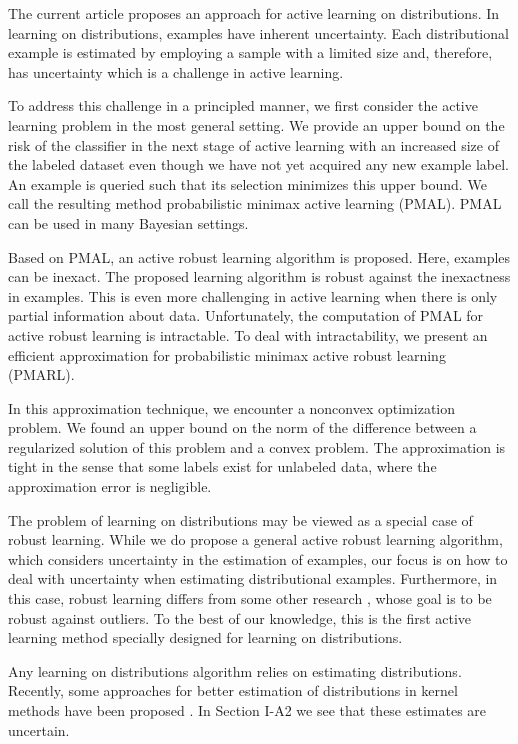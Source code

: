\documentclass[10pt,twocolumn]{IEEEtran}
\begin{document}
	The current article proposes an approach for active learning on distributions. In learning on distributions, examples have inherent uncertainty. Each distributional example is estimated by employing a sample with a limited size and, therefore, has uncertainty which is a challenge in active learning.
	
	To address this challenge in a principled manner, we first consider the active learning problem in the most general setting. We provide an upper bound on the risk of the classifier in the next stage of active learning with an increased size of the labeled dataset even though we have not yet acquired any new example label. An example is queried such that its selection minimizes this upper bound. We call the resulting method probabilistic minimax active learning (PMAL). PMAL can be used in many Bayesian settings.
	
	Based on PMAL, an active robust learning algorithm is proposed. Here, examples can be inexact. The proposed learning algorithm is robust against the inexactness in examples. This is even more challenging in active learning when there is only partial information about data. Unfortunately, the computation of PMAL for active robust learning is intractable. To deal with intractability, we present an efficient approximation for probabilistic minimax active robust learning (PMARL).
	
	In this approximation technique, we encounter a nonconvex optimization problem. We found an upper bound on the norm of the difference between a regularized solution of this problem and a convex problem. The approximation is tight in the sense that some labels exist for unlabeled data, where the approximation error is negligible.
	
	The problem of learning on distributions may be viewed as a special case of robust learning. While we do propose a general active robust learning algorithm, which considers uncertainty in the estimation of examples, our focus is on how to deal with uncertainty when estimating distributional examples. Furthermore, in this case, robust learning differs from some other research \cite{ghafarian2016active, xu2009robustness}, whose goal is to be robust against outliers. To the best of our knowledge, this is the first active learning method specially designed for learning on distributions.
	
	Any learning on distributions algorithm relies on estimating distributions. Recently, some approaches for better estimation of distributions in kernel methods have been proposed \cite{muandet2016kernel, muandet2017kernel}. In Section I-A2 we see that these estimates are uncertain.
	
\end{document}
